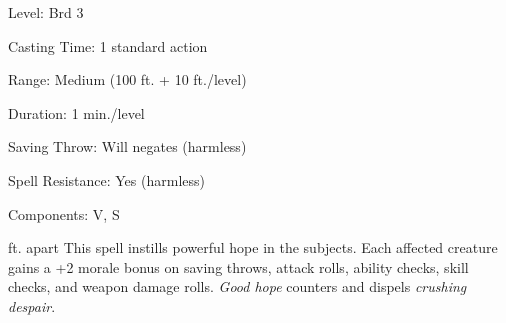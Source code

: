 
\begin{description*}
\item[Level:] Brd 3
\item[Casting Time:] 1 standard action
\item[Range:] Medium (100 ft. + 10 ft./level)
\item[Duration:] 1 min./level
\item[Saving Throw:] Will negates (harmless)
\item[Spell Resistance:] Yes (harmless)
\item[Components:] V, S
\end{description*}

ft. apart
This spell instills powerful hope in the subjects. Each affected creature gains
a +2 morale bonus on saving throws, attack rolls, ability checks, skill checks,
and weapon damage rolls.
\textit{Good hope} counters and dispels \textit{crushing despair}.